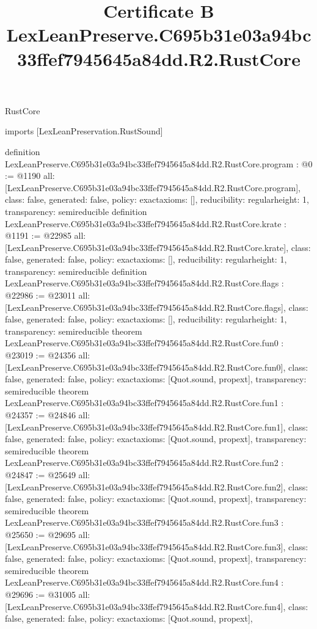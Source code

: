 \begin{lexlean}{RustCore}
\title{Certificate B LexLeanPreserve.C695b31e03a94bc33ffef7945645a84dd.R2.RustCore}
\begin{coremodule}
imports [LexLeanPreservation.RustSound]

definition LexLeanPreserve.C695b31e03a94bc33ffef7945645a84dd.R2.RustCore.program : @0 := @1190 {
  all: [LexLeanPreserve.C695b31e03a94bc33ffef7945645a84dd.R2.RustCore.program],
  class: false,
  generated: false,
  policy: exact{axioms: []},
  reducibility: regular{height: 1},
  transparency: semireducible
}
definition LexLeanPreserve.C695b31e03a94bc33ffef7945645a84dd.R2.RustCore.krate : @1191 := @22985 {
  all: [LexLeanPreserve.C695b31e03a94bc33ffef7945645a84dd.R2.RustCore.krate],
  class: false,
  generated: false,
  policy: exact{axioms: []},
  reducibility: regular{height: 1},
  transparency: semireducible
}
definition LexLeanPreserve.C695b31e03a94bc33ffef7945645a84dd.R2.RustCore.flags : @22986 := @23011 {
  all: [LexLeanPreserve.C695b31e03a94bc33ffef7945645a84dd.R2.RustCore.flags],
  class: false,
  generated: false,
  policy: exact{axioms: []},
  reducibility: regular{height: 1},
  transparency: semireducible
}
theorem LexLeanPreserve.C695b31e03a94bc33ffef7945645a84dd.R2.RustCore.fun0 : @23019 := @24356 {
  all: [LexLeanPreserve.C695b31e03a94bc33ffef7945645a84dd.R2.RustCore.fun0],
  class: false,
  generated: false,
  policy: exact{axioms: [Quot.sound, propext]},
  transparency: semireducible
}
theorem LexLeanPreserve.C695b31e03a94bc33ffef7945645a84dd.R2.RustCore.fun1 : @24357 := @24846 {
  all: [LexLeanPreserve.C695b31e03a94bc33ffef7945645a84dd.R2.RustCore.fun1],
  class: false,
  generated: false,
  policy: exact{axioms: [Quot.sound, propext]},
  transparency: semireducible
}
theorem LexLeanPreserve.C695b31e03a94bc33ffef7945645a84dd.R2.RustCore.fun2 : @24847 := @25649 {
  all: [LexLeanPreserve.C695b31e03a94bc33ffef7945645a84dd.R2.RustCore.fun2],
  class: false,
  generated: false,
  policy: exact{axioms: [Quot.sound, propext]},
  transparency: semireducible
}
theorem LexLeanPreserve.C695b31e03a94bc33ffef7945645a84dd.R2.RustCore.fun3 : @25650 := @29695 {
  all: [LexLeanPreserve.C695b31e03a94bc33ffef7945645a84dd.R2.RustCore.fun3],
  class: false,
  generated: false,
  policy: exact{axioms: [Quot.sound, propext]},
  transparency: semireducible
}
theorem LexLeanPreserve.C695b31e03a94bc33ffef7945645a84dd.R2.RustCore.fun4 : @29696 := @31005 {
  all: [LexLeanPreserve.C695b31e03a94bc33ffef7945645a84dd.R2.RustCore.fun4],
  class: false,
  generated: false,
  policy: exact{axioms: [Quot.sound, propext]},
}
\end{coremodule}
\end{lexlean}
